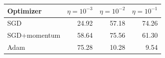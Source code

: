\begin{tabular}{lrrr}
\toprule
Optimizer & $\eta=10^{-3}$ & $\eta=10^{-2}$ & $\eta=10^{-1}$ \\
\midrule
SGD & 24.92 & 57.18 & 74.26 \\
SGD+momentum & 58.64 & 75.56 & 61.30 \\
Adam & 75.28 & 10.28 & 9.54 \\
\bottomrule
\end{tabular}

